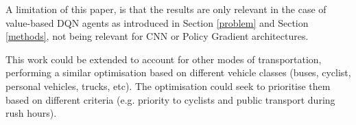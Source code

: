 \documentclass[conference]{IEEEtran}
\begin{document}
A limitation of this paper, is that the results are only relevant in the case of value-based DQN agents as introduced in Section \ref{problem} and Section \ref{methods}, not being relevant for CNN or Policy Gradient architectures.

This work could be extended to account for other modes of transportation, performing a similar optimisation based on different vehicle classes (buses, cyclist, personal vehicles, trucks, etc). The optimisation could seek to prioritise them based on different criteria (e.g. priority to cyclists and public transport during rush hours).

%



%
\end{document}
